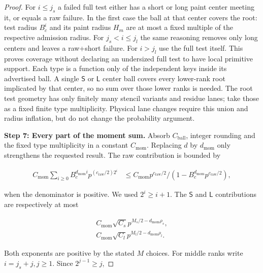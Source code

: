 \begin{proof}
For \(i\le j_{s}\) a failed full test either has a short or long paint center meeting it, or equals a raw failure. In the first case the ball at that center covers the root: test radius \(B_{c}^{i}\) and its paint radius \(H_{m}\) are at most a fixed multiple of the respective admission radius. For \(j_{s}<i\le j_{l}\) the same reasoning removes only long centers and leaves a raw+short failure. For \(i>j_{l}\) use the full test itself. This proves coverage without declaring an undersized full test to have local primitive support. Each type is a function only of the independent keys inside its advertised ball. A single \(\mathsf S\) or \(\mathsf L\) center ball covers every lower-rank root implicated by that center, so no sum over those lower ranks is needed. The root test geometry has only finitely many stencil variants and residue lanes; take those as a fixed finite type multiplicity. Physical lane changes require this union and radius inflation, but do not change the probability argument.

\smallskip\noindent\textbf{Step 7: Every part of the moment sum.} Absorb \(C_{\mathrm{ball}}\), integer rounding and the fixed type multiplicity in a constant \(C_{\mathrm{mom}}\). Replacing \(d\) by \(d_{\mathrm{mom}}\) only strengthens the requested result. The raw contribution is bounded by


\begin{equation}\label{q1:e12.7}
\begin{aligned}
C_{\mathrm{mom}} \sum _{i\ge 0} B_{c}^{d_{\mathrm{mom}} i} p^{(c_{\mathrm{raw}}/2)2^{i}}
&\le C_{\mathrm{mom}} p^{c_{\mathrm{raw}}/2}/(1-B_{c}^{d_{\mathrm{mom}}} p^{c_{\mathrm{raw}}/2}),
\end{aligned}
\end{equation}

when the denominator is positive. We used \(2^{i}\ge i+1\).
The \(\mathsf S\) and \(\mathsf L\) contributions are respectively at most

\begin{equation}\label{q1:e12.8}
\begin{gathered}
C_{\mathrm{mom}} \sqrt{C_{s}} p^{M_{s}/2-d_{\mathrm{mom}} \rho_{s}}, \\ C_{\mathrm{mom}} \sqrt{C_{l}} p^{M_{l}/2-d_{\mathrm{mom}} \rho_{l}}.
\end{gathered}
\end{equation}

Both exponents are positive by the stated \(M\) choices. For middle ranks write \(i=j_{s}+j, j\ge 1\). Since \(2^{j-1}\ge j\),


\end{proof}
